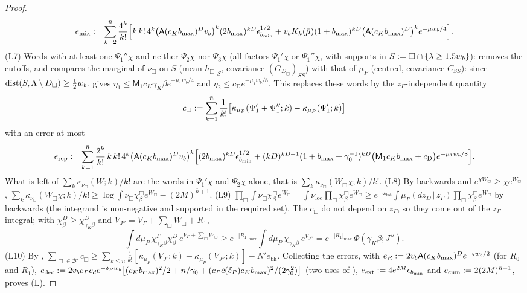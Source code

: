 \begin{proof}
\[
e_{\mathrm{mix}}:=\sum_{k=2}^{\bar n}\frac{4^k}{k!}\Big[k\,k!\,4^k\big(\mathsf A(c_Kb_{\max})^Dv_b\big)^k(2b_{\max})^{kD}\epsilon_{b_{\min}}^{1/2}+v_bK_k(\bar\mu)(1+b_{\max})^{kD}\big(\mathsf A(c_Kb_{\max})^D\big)^ke^{-\bar\mu w_b/4}\Big].
\]
(L7) Words with at least one $\Psi_1''\chi$ and neither $\Psi_2\chi$ nor $\Psi_3\chi$ (all factors $\Psi_1'\chi$ or $\Psi_1''\chi$, with supports in $S:=\Box\cap\{\lambda\ge1.5w_b\}$):  removes the cutoffs, and  compares the marginal of $\nu_\Box$ on $S$ (mean $h_\Box|_S$, covariance $(G_{D_\Box})_{SS}$) with that of $\mu_P$ (centred, covariance $C_{SS}$): since $\operatorname{dist}(S,\Lambda\setminus D_\Box)\ge\frac12w_b$,  gives $\eta_1\le\mathsf M_1c_K\gamma_K\beta e^{-\mu_1w_b/4}$ and $\eta_2\le c_{\mathrm D}e^{-\mu_1w_b/8}$. This replaces these words by the $z_\Gamma$-independent quantity
\[
c_\Box:=\sum_{k=1}^{\bar n}\frac1{k!}\big[\kappa_{\mu_P}(\Psi_1'+\Psi_1'';k)-\kappa_{\mu_P}(\Psi_1';k)\big]
\]
with an error at most
\[
e_{\mathrm{rep}}:=\sum_{k=1}^{\bar n}\frac{2^k}{k!}\,k\,k!\,4^k\big(\mathsf A(c_Kb_{\max})^Dv_b\big)^k\Big[(2b_{\max})^{kD}\epsilon_{b_{\min}}^{1/2}+(kD)^{kD+1}(1+b_{\max}+\gamma_0^{-1})^{kD}\big(\mathsf M_1c_Kb_{\max}+c_{\mathrm D}\big)e^{-\mu_1w_b/8}\Big].
\]
What is left of $\sum_k\kappa_{\nu_\Box}(W;k)/k!$ are the words in $\Psi_1'\chi$ and $\Psi_2\chi$ alone, that is $\sum_k\kappa_{\nu_\Box}(W_\Box\chi;k)/k!$. (L8) By  backwards and $e^{\chi W_\Box}\ge\chi e^{W_\Box}$, $\sum_k\kappa_{\nu_\Box}(W_\Box\chi;k)/k!\ge\log\int\nu_\Box\chi^\Box_\beta e^{W_\Box}-(2M)^{\bar n+1}$. (L9) $\prod_\Box\int\nu_\Box\chi^\Box_\beta e^{W_\Box}=\int\nu_{\mathrm{loc}}\prod_\Box\chi^\Box_\beta e^{W_\Box}\ge e^{-\omega_{\mathrm{tot}}}\int\mu_P(dz_D\,|\,z_\Gamma)\prod_\Box\chi^\Box_\beta e^{W_\Box}$ by  backwards (the integrand is non-negative and supported in the required set). The $c_\Box$ do not depend on $z_\Gamma$, so they come out of the $z_\Gamma$ integral; with $\chi^D_\beta\ge\chi^D_{\gamma_K\beta}$ and $V_{J''}=V_\Gamma+\sum_\Box W_\Box+R_1$,
\[
\int d\mu_P\,\chi^\Gamma_{\gamma_K\beta}\chi^D_\beta\,e^{V_\Gamma+\sum_\Box W_\Box}\ge e^{-|R_1|_{\max}}\int d\mu_P\,\chi_{\gamma_K\beta}\,e^{V_{J''}}=e^{-|R_1|_{\max}}\,\Phi(\gamma_K\beta;J'').
\]
(L10) By , $\sum_{\Box\in\mathcal B'}c_\Box\ge\sum_{k\le\bar n}\frac1{k!}[\kappa_{\mu_P}(V_{J'};k)-\kappa_{\mu_P}(V_{J''};k)]-N'e_{\mathrm{bk}}$. Collecting the errors, with $e_R:=2v_b\mathsf A(c_Kb_{\max})^De^{-\varsigma w_b/2}$ (for $R_0$ and $R_1$), $e_{\mathrm{dec}}:=2v_bc_Pc_de^{-\delta_Pw_b}\big[(c_Kb_{\max})^2/2+n/\gamma_0+(c_P\tilde c(\delta_P)c_Kb_{\max})^2/(2\gamma_0^2)\big]$ (two uses of ), $e_{\mathrm{ext}}:=4e^{2M}\epsilon_{b_{\min}}$ and $e_{\mathrm{cum}}:=2(2M)^{\bar n+1}$, proves (L).


\end{proof}
